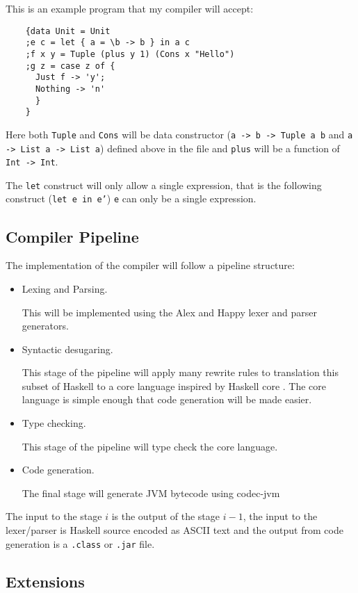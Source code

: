 \documentclass[a4paper]{article}
\begin{document}
  This is an example program that my compiler will accept:

  \begin{verbatim}
    {data Unit = Unit
    ;e c = let { a = \b -> b } in a c
    ;f x y = Tuple (plus y 1) (Cons x "Hello")
    ;g z = case z of {
      Just f -> 'y';
      Nothing -> 'n'
      }
    }
  \end{verbatim}

  Here both \texttt{Tuple} and \texttt{Cons} will be data constructor (\texttt{a -> b -> Tuple a b} and \texttt{a -> List a -> List a}) 
  defined above in the file and \texttt{plus} will be a function of \texttt{Int -> Int}.

  The \texttt{let} construct will only allow a single expression, that is the following construct (\texttt{let e in e'})
  \texttt{e} can only be a single expression.

  \subsection*{Compiler Pipeline}
  The implementation of the compiler will follow a pipeline structure:

  \begin{itemize}
    \item Lexing and Parsing.

      This will be implemented using the Alex and Happy lexer and parser generators.
    \item Syntactic desugaring.

      This stage of the pipeline will apply many rewrite rules to translation this subset of Haskell to a core language inspired by Haskell core \cite{typedcorelink}.
      The core language is simple enough that code generation will be made easier.
    \item Type checking.

     This stage of the pipeline will type check the core language.
    \item Code generation.

     The final stage will generate JVM bytecode using codec-jvm \cite{codec-jvm-link}
  \end{itemize}

  The input to the stage $i$ is the output of the stage $i-1$, the input to the lexer/parser is Haskell source encoded as ASCII text and the
  output from code generation is a \texttt{.class} or \texttt{.jar} file. 

  \subsection*{Extensions}
\end{document}
